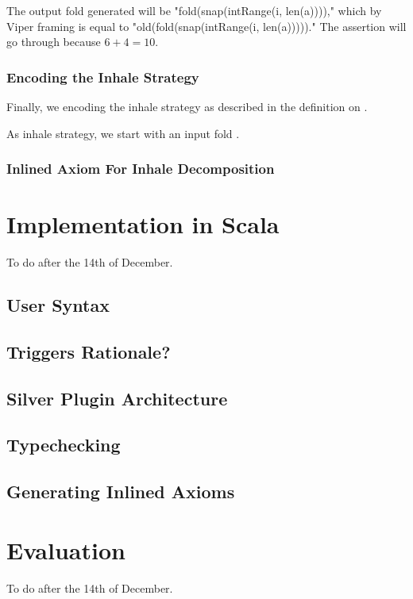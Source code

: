 \documentclass[msc,oneside]{ubcthesis}
\theoremstyle{definition}
\begin{document}
The output fold generated will be "fold(snap(intRange(i, len(a))))," which by Viper framing is equal to "old(fold(snap(intRange(i, len(a)))))." The assertion will go through because $6 + 4 = 10$.

\subsection{Encoding the Inhale Strategy }
Finally, we encoding the inhale strategy as described in the definition on .

As  inhale strategy, we start with an input fold .  


\subsection{Inlined Axiom For Inhale Decomposition}



\chapter{Implementation in Scala}
To do after the 14th of December. 
\section{User Syntax}

\section{Triggers Rationale?}

\section{Silver Plugin Architecture}

\section{Typechecking}

\section{Generating Inlined Axioms}

\chapter{Evaluation}
To do after the 14th of December. 
\end{document}
